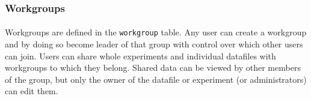 \subsubsection{Workgroups}
\label{sec:model_workgroups}

\paragraph{}
Workgroups are defined in the \texttt{workgroup} table. Any user can create a workgroup and by doing so become leader of that group with control over which other users can join. Users can share whole experiments and individual datafiles with workgroups to which they belong. Shared data can be viewed by other members of the group, but only the owner of the datafile or experiment (or administrators) can edit them.
